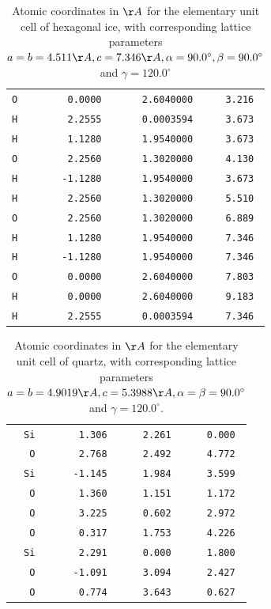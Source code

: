 \twolinestyle{\documentclass[prb,preprint]{revtex4}}
\begin{document}
{\begin{table}[h]
\caption{Atomic coordinates in $\AA$ for the elementary unit cell of hexagonal ice,
with corresponding lattice parameters $a=b=4.511 \AA, c=7.346 \AA, \alpha=90.0^\circ, 
\beta=90.0^\circ$ and $\gamma=120.0^\circ$
\label{ICE}
}
\begin{tabular}{lrrr}
\hline
\tt  O & \tt   0.0000   &   \tt  2.6040000  & \tt    3.216 \\
\tt  H & \tt   2.2555   &   \tt  0.0003594  & \tt    3.673 \\
\tt  H & \tt   1.1280   &   \tt  1.9540000  & \tt    3.673 \\
\tt  O & \tt   2.2560   &   \tt  1.3020000  & \tt    4.130 \\
\tt  H & \tt  -1.1280   &   \tt  1.9540000  & \tt    3.673 \\
\tt  H & \tt   2.2560   &   \tt  1.3020000  & \tt    5.510 \\
\tt  O & \tt   2.2560   &   \tt  1.3020000  & \tt    6.889 \\
\tt  H & \tt   1.1280   &   \tt  1.9540000  & \tt    7.346 \\
\tt  H & \tt  -1.1280   &   \tt  1.9540000  & \tt    7.346 \\
\tt  O & \tt   0.0000   &   \tt  2.6040000  & \tt    7.803 \\
\tt  H & \tt   0.0000   &   \tt  2.6040000  & \tt    9.183 \\
\tt  H & \tt   2.2555   &   \tt  0.0003594  & \tt    7.346 \\
\hline
\end{tabular}
\end{table}

\begin{table}[h]
\caption{Atomic coordinates in $\AA$ for the elementary unit cell of quartz,
with corresponding lattice parameters 
$a=b=4.9019 {\AA}, c=5.3988 {\AA}, \alpha=\beta=90.0^\circ $ 
and $\gamma=120.0^\circ $.}\label{QTZ}
\begin{tabular}{rrrr}
\hline
\tt  Si  &   \tt   1.306   &  \tt   2.261  &   \tt   0.000  \\
\tt   O  &   \tt   2.768   &  \tt   2.492  &   \tt   4.772  \\
\tt  Si  &   \tt  -1.145   &  \tt   1.984  &   \tt   3.599  \\
\tt   O  &   \tt   1.360   &  \tt   1.151  &   \tt   1.172  \\
\tt   O  &   \tt   3.225   &  \tt   0.602  &   \tt   2.972  \\
\tt   O  &   \tt   0.317   &  \tt   1.753  &   \tt   4.226  \\
\tt  Si  &   \tt   2.291   &  \tt   0.000  &   \tt   1.800  \\
\tt   O  &   \tt  -1.091   &  \tt   3.094  &   \tt   2.427  \\
\tt   O  &   \tt   0.774   &  \tt   3.643  &   \tt   0.627  \\
\hline
\end{tabular}
\end{table}

}
\end{document}
